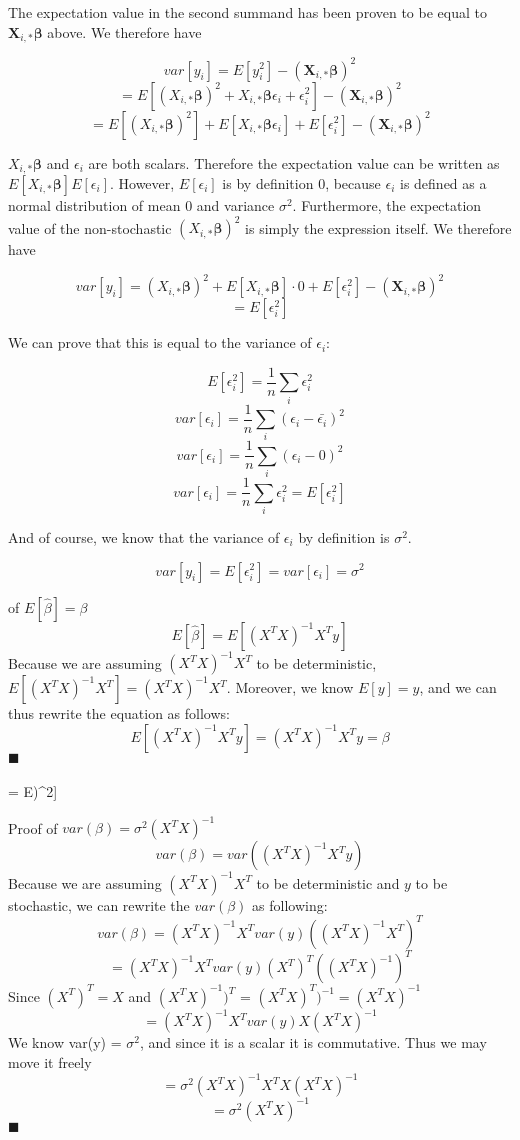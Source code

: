 \documentclass{article}
\begin{document}
The expectation value in the second summand has been proven to be equal 
to $\bm{X}_{i,*}\bm{\beta}$ above. We therefore have

\[ var[y_i] = E[y_i^2] - (\bm{X}_{i,*}\bm{\beta})^2 \]
\[ = E\left[(X_{i,*}\bm{\beta})^2 + X_{i,*}\bm{\beta}\epsilon_i + \epsilon_i^2\right] - (\bm{X}_{i,*}\bm{\beta})^2 \]
\[ = E\left[(X_{i,*}\bm{\beta})^2\right] + E[X_{i,*}\bm{\beta}\epsilon_i] + E[\epsilon_i^2] - (\bm{X}_{i,*}\bm{\beta})^2 \]

$X_{i,*}\bm{\beta}$ and $\epsilon_i$ are both scalars. Therefore the expectation value can be written as
$E[X_{i,*}\bm{\beta}]E[\epsilon_i]$. However, $E[\epsilon_i]$ is by definition $0$, because $\epsilon_i$ is
defined as a normal distribution of mean $0$ and variance $\sigma^2$. Furthermore, the expectation value of the
non-stochastic $(X_{i,*}\bm{\beta})^2$ is simply the expression itself. We therefore have

\[ var[y_i] = (X_{i,*}\bm{\beta})^2 + E[X_{i,*}\bm{\beta}]\cdot 0 + E[\epsilon_i^2] - (\bm{X}_{i,*}\bm{\beta})^2 \]
\[ = E[\epsilon_i^2] \]

We can prove that this is equal to the variance of $\epsilon_i$:

\[ E[\epsilon_i^2] = \frac{1}{n} \sum_i \epsilon_i^2\]
\[ var[\epsilon_i] = \frac{1}{n} \sum_i (\epsilon_i - \bar{\epsilon_i})^2\]
\[ var[\epsilon_i] = \frac{1}{n} \sum_i (\epsilon_i - 0)^2\]
\[ var[\epsilon_i] = \frac{1}{n} \sum_i \epsilon_i^2 = E[\epsilon_i^2] \]

And of course, we know that the variance of $\epsilon_i$ by definition is $\sigma^2$.

\[ var[y_i] = E[\epsilon_i^2] = var[\epsilon_i] = \sigma^2 \]

\Proof of $E[\hat{\beta}] = \beta$
$$E[\hat{\beta}] = E[(X^{T}X)^{-1}X^{T}y]$$
Because we are assuming $(X^{T}X)^{-1}X^{T}$ to be deterministic, $E[(X^{T}X)^{-1}X^{T}] = (X^{T}X)^{-1}X^{T}$. Moreover, we know $E[y] = y$, and we can thus rewrite the equation as follows:
$$E[(X^{T}X)^{-1}X^{T}y] = (X^{T}X)^{-1}X^{T}y = \beta$$
$\blacksquare$
\\
\\[ var[y_i] = E\left[(y_i - E[y_i])^2\right] \]

Proof of $var(\beta) = \sigma^{2}(X^{T}X)^{-1}$
$$var(\beta) = var((X^{T}X)^{-1}X^{T}y)$$
Because we are assuming $(X^{T}X)^{-1}X^{T}$ to be deterministic and $y$ to be stochastic, we can rewrite the $var(\beta)$ as following:
$$var(\beta) = (X^{T}X)^{-1}X^{T}var(y)((X^{T}X)^{-1}X^{T})^{T}$$
$$ = (X^{T}X)^{-1}X^{T}var(y)(X^{T})^{T}((X^{T}X)^{-1})^{T}$$
Since $(X^{T})^{T} = X$ and $(X^{T}X)^{-1})^{T}$ = $(X^{T}X)^{T})^{-1} = (X^{T}X)^{-1}$
$$ = (X^{T}X)^{-1}X^{T}var(y)X(X^{T}X)^{-1} $$
We know var(y) = $\sigma^{2}$, and since it is a scalar it is commutative. Thus we may move it freely
$$ = \sigma^{2}(X^{T}X)^{-1}X^{T}X(X^{T}X)^{-1} $$
$$ = \sigma^{2}(X^{T}X)^{-1} $$
$\blacksquare$
\end{document}
